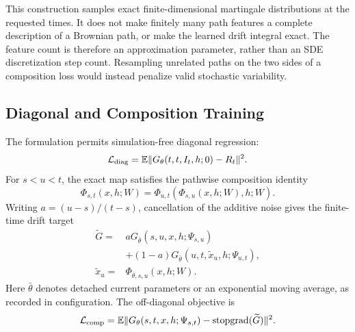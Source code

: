 This construction samples exact finite-dimensional martingale distributions at the requested times. It does not make finitely many path features a complete description of a Brownian path, or make the learned drift integral exact. The feature count is therefore an approximation parameter, rather than an SDE discretization step count. Resampling unrelated paths on the two sides of a composition loss would instead penalize valid stochastic variability.

\subsection{Diagonal and Composition Training}
The formulation permits simulation-free diagonal regression:
\begin{equation}
 \mathcal L_{\mathrm{diag}}=
 \mathbb{E}\|G_\theta(t,t,I_t,h;0)-R_t\|^2.
 \label{eq:diagonal}
\end{equation}
For $s<u<t$, the exact map satisfies the pathwise composition identity
\begin{equation}
 \Phi_{s,t}(x,h;W)=
 \Phi_{u,t}(\Phi_{s,u}(x,h;W),h;W).
 \label{eq:composition}
\end{equation}
Writing $a=(u-s)/(t-s)$, cancellation of the additive noise gives the finite-time drift target
\begin{align}
 \widetilde G={}&aG_{\bar\theta}(s,u,x,h;\Psi_{s,u})\nonumber\\
 &+(1-a)G_{\bar\theta}(u,t,\widetilde x_u,h;\Psi_{u,t}),\\
 \widetilde x_u={}&\Phi_{\bar\theta,s,u}(x,h;W).
\end{align}
Here $\bar\theta$ denotes detached current parameters or an exponential moving average, as recorded in configuration. The off-diagonal objective is
\begin{equation}
 \mathcal L_{\mathrm{comp}}=
 \mathbb{E}\|G_\theta(s,t,x,h;\Psi_{s,t})-\operatorname{stopgrad}(\widetilde G)\|^2.
 \label{eq:psd}
\end{equation}

